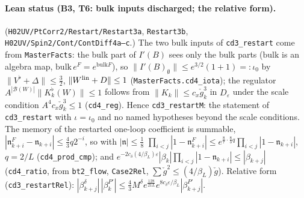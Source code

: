 \documentclass[11pt]{amsart}
\theoremstyle{definition}
\theoremstyle{remark}
\numberwithin{equation}{section}
\begin{document}
\paragraph{Lean status (B3, T6: bulk inputs discharged; the relative form).}
(\texttt{H02UV/PtCorr2/Restart/Restart3a}, \texttt{Restart3b}, \texttt{H02UV/Spin2/Cont/ContDiff4a--c}.) The two bulk inputs of
\texttt{cd3\_restart} come from \texttt{MasterFacts}: the bulk part of $I'(B)$ sees only the bulk parts
($\mathrm{bulk}$ is an algebra map, $\mathrm{bulk}\,e^F=e^{\mathrm{bulk}F}$), so
$\|I'(B)_\emptyset\|\le e^{3/2}(1+1)=:\iota_0$ by $\|V^\flat+\Delta\|\le\frac32$, $\|W^{\rm lin}+D\|\le1$
(\texttt{MasterFacts.cd4\_iota}); the regulator $A^{|\mathcal B(W)|}\|K^\flat_k(W)\|\le1$ follows from
$\|K_k\|\le c_x\check g_k^3$ in $D_\varepsilon$ under the scale condition $A^4c_x\check g_k^3\le1$
(\texttt{cd4\_reg}). Hence \texttt{cd3\_restartM}: the statement of \texttt{cd3\_restart} with $\iota=\iota_0$ and no
named hypotheses beyond the scale conditions. The memory of the restarted one-loop coefficient is summable,
$|\mathfrak n^F_{k+i}-\mathfrak n_{k+i}|\le\frac43q2^{-i}$, so with $|\mathfrak n|\le\frac18$
$\prod_{i<j}|1-\mathfrak n^F_{k+i}|\le e^{\frac87\cdot\frac83q}\prod_{i<j}|1-\mathfrak n_{k+i}|$, $q=2/L$
(\texttt{cd4\_prod\_cmp}); and $e^{-2c_\delta(4/\beta_L)\varepsilon}|\beta_k|\prod_{i<j}|1-\mathfrak n_{k+i}|\le|\beta_{k+j}|$
(\texttt{cd4\_ratio}, from \texttt{bt2\_flow}, \texttt{Case2Rel}, $\sum\check g^2\le(4/\beta_L)\check g$). Relative form
(\texttt{cd3\_restartRel}): $|\beta^\delta_{k+j}|\,|\beta^{P'}_k|\le\frac43M^\delta e^{\frac{128}{21L}}e^{8c_\delta\varepsilon/\beta_L}|\beta^{P'}_{k+j}|$.
\end{document}
